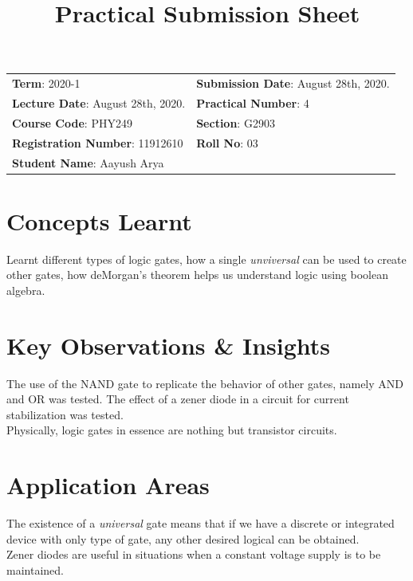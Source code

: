 \documentclass{article}
\title{Practical Submission Sheet}
\date{}
\newcommand{\bb}[1]{\textbf{#1}}
\begin{document}
	\maketitle
	\begin{tabular}{ll}
		\bb{Term}: 2020-1 & \bb{Submission Date}: August 28th, 2020.\\
		\bb{Lecture Date}: August 28th, 2020. & \bb{Practical Number}: 4\\
		\bb{Course Code}: PHY249 & \bb{Section}: G2903\\
		\bb{Registration Number}: 11912610 & \bb{Roll No}: 03\\
		\bb{Student Name}: Aayush Arya & \\
	\end{tabular}
	
	\section*{Concepts Learnt}
	Learnt different types of logic gates, how a single \textit{unviversal} can be used to create other gates, how deMorgan's theorem helps us understand logic using boolean algebra.
	
	\section*{Key Observations \& Insights}
	The use of the NAND gate to replicate the behavior of other gates, namely AND and OR was tested. The effect of a zener diode in a circuit for current stabilization was tested. \\Physically, logic gates in essence are nothing but transistor circuits.
	
	\section*{Application Areas}
	The existence of a 
	\textit{universal} gate means that if we have a discrete or integrated device with only type of gate, any other desired logical can be obtained.\\Zener diodes are useful in situations when a constant voltage supply is to be maintained.
\end{document}

